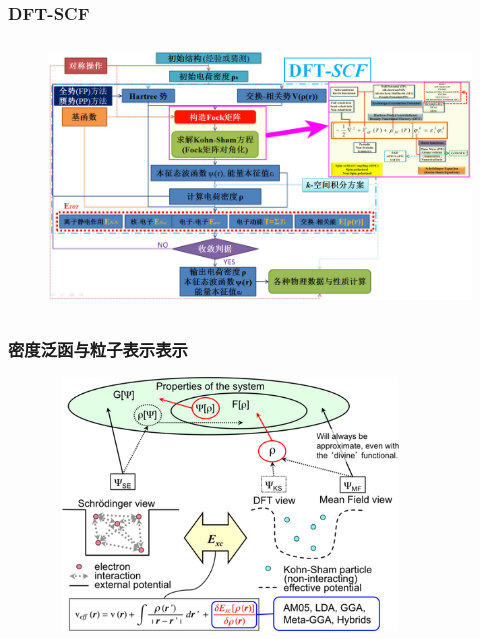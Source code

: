 \frame
{
	\frametitle{\textrm{DFT-SCF}}
\begin{figure}[h!]
\centering
\vspace*{-0.25in}
\hspace*{-0.80in}
\includegraphics[height=2.80in,width=4.95in,viewport=5 3 1490 870,clip]{Figures/DFT-SCF_2.png}
\label{DFT-SCF-2}
\end{figure}
}

\frame
{
	\frametitle{密度泛函与粒子表示表示}
\begin{figure}[h!]
\vskip -10pt
\centering
\includegraphics[height=2.65in,width=3.8in,viewport=0 0 362 275,clip]{Figures/DFT-particle-density.png}
\caption{\fontsize{6.0pt}{4.5pt}}%
\label{Schrodinger-equation-vs-Kohn-Sham-equation}
\end{figure}
}

